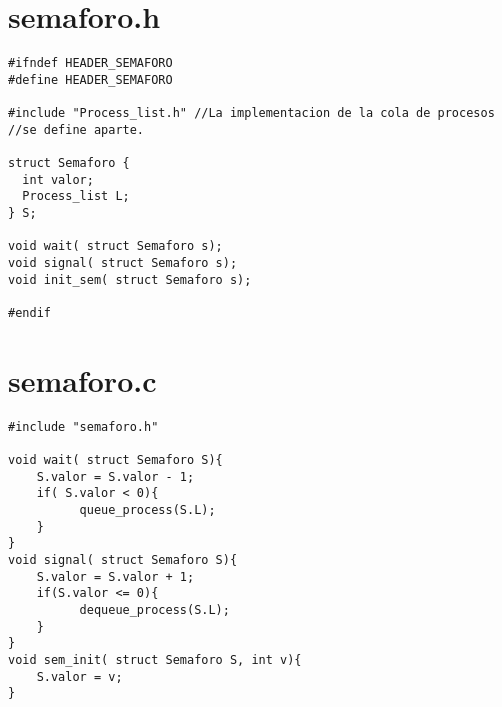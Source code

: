 \documentclass{article}
\author{\nombre , \carnet}
\title{\titulo}
\begin{document}
\maketitle

\section{semaforo.h}
\begin{lstlisting}
#ifndef HEADER_SEMAFORO
#define HEADER_SEMAFORO

#include "Process_list.h" //La implementacion de la cola de procesos
//se define aparte.

struct Semaforo {
  int valor;
  Process_list L;
} S;

void wait( struct Semaforo s);
void signal( struct Semaforo s);
void init_sem( struct Semaforo s);

#endif
\end{lstlisting} 
\section{semaforo.c}
\begin{lstlisting}
#include "semaforo.h"

void wait( struct Semaforo S){
	S.valor = S.valor - 1;
	if( S.valor < 0){
          queue_process(S.L);
	}
}
void signal( struct Semaforo S){
	S.valor = S.valor + 1;
	if(S.valor <= 0){
          dequeue_process(S.L);
	}
}
void sem_init( struct Semaforo S, int v){
	S.valor = v;
}
\end{lstlisting} 
\end{document}
